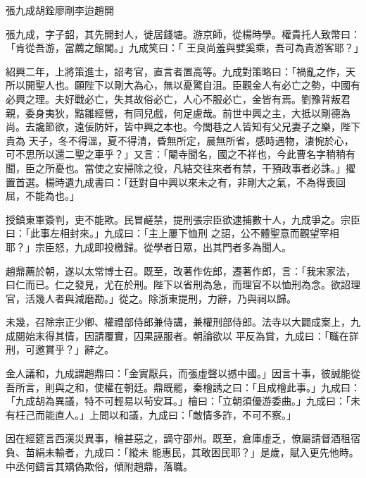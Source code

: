 
\begin{pinyinscope}

 張九成胡銓廖剛李迨趙開



 張九成，字子韶，其先開封人，徙居錢塘。游京師，從楊時學。權貴托人致幣曰：「肯從吾游，當薦之館閣。」九成笑曰：「
 王良尚羞與嬖奚乘，吾可為貴游客耶？」



 紹興二年，上將策進士，詔考官，直言者置高等。九成對策略曰：「禍亂之作，天所以開聖人也。願陛下以剛大為心，無以憂驚自沮。臣觀金人有必亡之勢，中國有必興之理。夫好戰必亡，失其故俗必亡，人心不服必亡，金皆有焉。劉豫背叛君親，委身夷狄，黠雛經營，有同兒戲，何足慮哉。前世中興之主，大抵以剛德為尚。去讒節欲，遠佞防奸，皆中興之本也。今閭巷之人皆知有父兄妻子之樂，陛下貴為
 天子，冬不得溫，夏不得清，昏無所定，晨無所省，感時遇物，淒惋於心，可不思所以還二聖之車乎？」又言：「閹寺聞名，國之不祥也，今此曹名字稍稍有聞，臣之所憂也。當使之安掃除之役，凡結交往來者有禁，干預政事者必誅。」擢置首選。楊時遺九成書曰：「廷對自中興以來未之有，非剛大之氣，不為得喪回屈，不能為也。」



 授鎮東軍簽判，吏不能欺。民冒鹺禁，提刑張宗臣欲逮捕數十人，九成爭之。宗臣曰：「此事左相封來。」九成曰：「主上屢下恤刑
 之詔，公不體聖意而觀望宰相耶？」宗臣怒，九成即投檄歸。從學者日眾，出其門者多為聞人。



 趙鼎薦於朝，遂以太常博士召。既至，改著作佐郎，遷著作郎，言：「我宋家法，曰仁而已。仁之發見，尤在於刑。陛下以省刑為急，而理官不以恤刑為念。欲詔理官，活幾人者與減磨勘。」從之。除浙東提刑，力辭，乃與祠以歸。



 未幾，召除宗正少卿、權禮部侍郎兼侍講，兼權刑部侍郎。法寺以大闢成案上，九成閱始末得其情，因請覆實，囚果誣服者。朝論欲以
 平反為賞，九成曰：「職在詳刑，可邀賞乎？」辭之。



 金人議和，九成謂趙鼎曰：「金實厭兵，而張虛聲以撼中國。」因言十事，彼誠能從吾所言，則與之和，使權在朝廷。鼎既罷，秦檜誘之曰：「且成檜此事。」九成曰：「九成胡為異議，特不可輕易以茍安耳。」檜曰：「立朝須優游委曲。」九成曰：「未有枉己而能直人。」上問以和議，九成曰：「敵情多詐，不可不察。」



 因在經筵言西漢災異事，檜甚惡之，謫守邵州。既至，倉庫虛乏，僚屬請督酒租宿負、苗絹未輸者，九成曰：「縱未
 能惠民，其敢困民耶？」是歲，賦入更先他時。中丞何鑄言其矯偽欺俗，傾附趙鼎，落職。




\end{pinyinscope}
